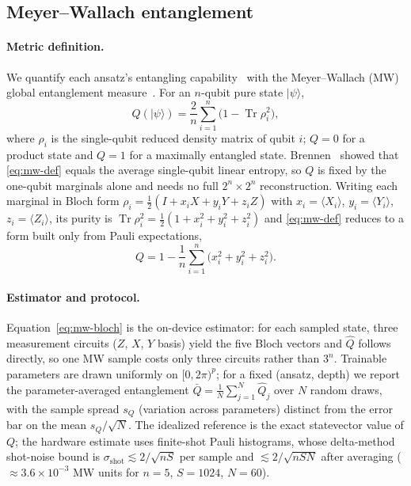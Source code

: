\documentclass[letterpaper]{article} %
\begin{document}
\subsection{Meyer--Wallach entanglement}

\paragraph{Metric definition.}
We quantify each ansatz's entangling capability~\cite{sim2019} with the
Meyer--Wallach (MW) global entanglement measure~\cite{meyerwallach2002}. For an
$n$-qubit pure state $|\psi\rangle$,
\begin{equation}
  Q(|\psi\rangle)
  =
  \frac{2}{n}\sum_{i=1}^{n}\bigl(1-\operatorname{Tr}\rho_i^{2}\bigr),
  \label{eq:mw-def}
\end{equation}
where $\rho_i$ is the single-qubit reduced density matrix of qubit $i$;
$Q=0$ for a product state and $Q=1$ for a maximally entangled state.
Brennen~\cite{brennen2003} showed that \eqref{eq:mw-def} equals the average
single-qubit linear entropy, so $Q$ is fixed by the one-qubit marginals alone
and needs no full $2^{n}\times 2^{n}$ reconstruction. Writing each marginal in
Bloch form $\rho_i=\tfrac12(I+x_iX+y_iY+z_iZ)$ with $x_i=\langle X_i\rangle$,
$y_i=\langle Y_i\rangle$, $z_i=\langle Z_i\rangle$, its purity is
$\operatorname{Tr}\rho_i^{2}=\tfrac12(1+x_i^{2}+y_i^{2}+z_i^{2})$
and \eqref{eq:mw-def} reduces to a form built only from Pauli expectations,
\begin{equation}
  Q = 1-\frac{1}{n}\sum_{i=1}^{n}\bigl(x_i^{2}+y_i^{2}+z_i^{2}\bigr).
  \label{eq:mw-bloch}
\end{equation}

\paragraph{Estimator and protocol.}
Equation~\eqref{eq:mw-bloch} is the on-device estimator: for each sampled state,
three measurement circuits ($Z$, $X$, $Y$ basis) yield the five Bloch vectors and
$\hat Q$ follows directly, so one MW sample costs only three circuits rather than
$3^{n}$. Trainable parameters are drawn uniformly on $[0,2\pi)^{p}$; for a fixed
(ansatz, depth) we report the parameter-averaged entanglement
$\bar Q=\tfrac1N\sum_{j=1}^{N}\hat Q_j$ over $N$ random draws, with the sample
spread $s_Q$ (variation across parameters) distinct from the error bar on the
mean $s_Q/\sqrt N$. The idealized reference is the exact statevector value of
$Q$; the hardware estimate uses finite-shot Pauli histograms, whose delta-method
shot-noise bound is $\sigma_{\mathrm{shot}}\lesssim 2/\sqrt{nS}$ per sample and
$\lesssim 2/\sqrt{nSN}$ after averaging ($\approx 3.6\times10^{-3}$ MW units for
$n{=}5$, $S{=}1024$, $N{=}60$).
\end{document}

